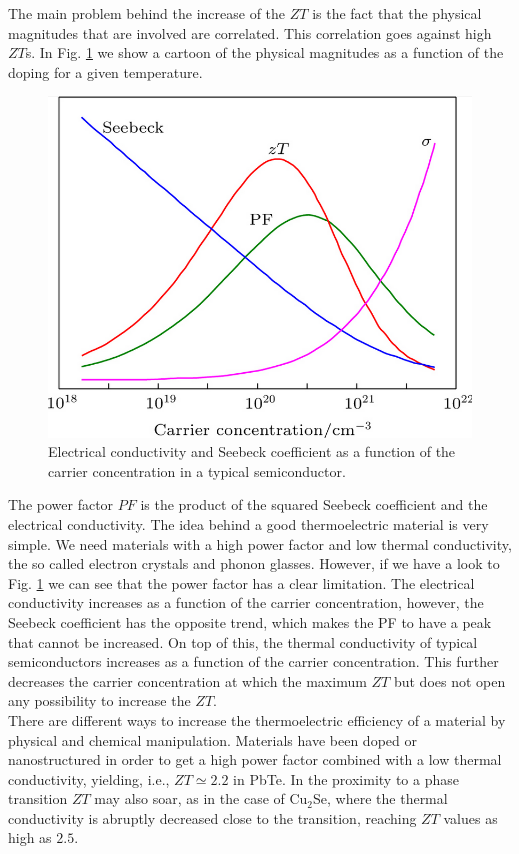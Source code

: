 The main problem behind the increase of the $ZT$ is the fact that the physical magnitudes that are involved are 
correlated. This correlation goes against high $ZT$s. In Fig. \ref{decouple} we show a cartoon of the physical 
magnitudes as a function of the doping for a given temperature.
\begin{figure}[h]
\begin{center}
\includegraphics[width=0.8\linewidth]{Figures/decoupling.png}
\caption[Thermoelectric physical magnitudes]{Electrical conductivity and  Seebeck coefficient as a function of the 
carrier concentration in a typical semiconductor.}
\label{decouple}
\end{center}
\end{figure}
The power factor $PF$ is the product of the squared Seebeck coefficient and the electrical conductivity. The idea 
behind a good thermoelectric material is very simple. We need materials with a high power factor and low thermal 
conductivity, the so called electron crystals and phonon glasses. However, if we have a look to Fig. \ref{decouple}
we can see that the power factor has a clear limitation. The electrical conductivity increases as a function of the 
carrier concentration, however, the Seebeck coefficient has the opposite trend, which makes the PF to have a peak 
that cannot be increased. On top of this, the thermal conductivity of typical semiconductors increases as a 
function of the carrier concentration. This further decreases the carrier concentration at which the maximum $ZT$ 
but does not open any possibility to increase the $ZT$. \\

There are different ways to increase the thermoelectric efficiency of a material by physical and chemical 
manipulation. Materials have been doped\cite{kim2013engineered,pei2011stabilizing,heremans2008enhancement} or
nanostructured\cite{vineis2010nanostructured,minnich2009bulk} in order to get a high power factor combined with a 
low thermal conductivity, yielding, i.e., $ZT\simeq 2.2$ in PbTe\cite{hsu2004cubic}. In the proximity to a phase 
transition $ZT$ may also soar, as in the case of Cu$_{2}$Se\cite{liu2013ultrahigh}, where the thermal conductivity 
is abruptly decreased close to the transition, reaching $ZT$ values as high as $2.5$. \\

